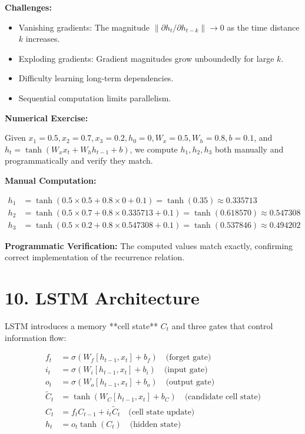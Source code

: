 \documentclass[10pt]{article}
\begin{document}
\textbf{Challenges:}

\begin{itemize}
\item Vanishing gradients: The magnitude $\|\partial h_t / \partial h_{t-k}\| \to 0$ as the time distance $k$ increases.
\item Exploding gradients: Gradient magnitudes grow unboundedly for large $k$.
\item Difficulty learning long-term dependencies.
\item Sequential computation limits parallelism.
\end{itemize}

\textbf{Numerical Exercise:}

Given $x_1 = 0.5, x_2 = 0.7, x_3 = 0.2, h_0 = 0, W_x = 0.5, W_h = 0.8, b = 0.1$, and
$h_t = \tanh(W_x x_t + W_h h_{t-1} + b)$, we compute $h_1, h_2, h_3$ both manually and 
programmatically and verify they match.

\textbf{Manual Computation:}

\begin{align*}
h_1 &= \tanh(0.5 \times 0.5 + 0.8 \times 0 + 0.1) = \tanh(0.35) \approx 0.335713\\
h_2 &= \tanh(0.5 \times 0.7 + 0.8 \times 0.335713 + 0.1) = \tanh(0.618570) \approx 0.547308\\
h_3 &= \tanh(0.5 \times 0.2 + 0.8 \times 0.547308 + 0.1) = \tanh(0.537846) \approx 0.494202
\end{align*}

\textbf{Programmatic Verification:} The computed values match exactly, confirming correct 
implementation of the recurrence relation.

\section*{10. LSTM Architecture}

LSTM introduces a memory **cell state** $C_t$ and three gates that control information flow:

\begin{align*}
f_t &= \sigma(W_f[h_{t-1}, x_t] + b_f) \quad \text{(forget gate)}\\
i_t &= \sigma(W_i[h_{t-1}, x_t] + b_i) \quad \text{(input gate)}\\
o_t &= \sigma(W_o[h_{t-1}, x_t] + b_o) \quad \text{(output gate)}\\
\tilde{C}_t &= \tanh(W_C[h_{t-1}, x_t] + b_C) \quad \text{(candidate cell state)}\\
C_t &= f_t C_{t-1} + i_t \tilde{C}_t \quad \text{(cell state update)}\\
h_t &= o_t \tanh(C_t) \quad \text{(hidden state)}
\end{align*}
\end{document}
